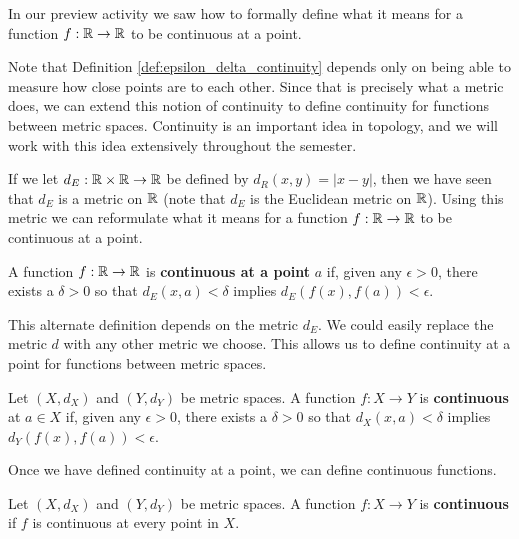\label{sec_cont_func_btwn}
In our preview activity we saw how to formally define what it means for a function $f : \mathbb{R} \to \mathbb{R}$ to be continuous at a point. 


Note that Definition \ref{def:epsilon_delta_continuity} depends only on being able to measure how close points are to each other. Since that is precisely what a metric does, we can extend this notion of continuity to define continuity for functions between metric spaces. Continuity is an important idea in topology, and we will work with this idea extensively throughout the semester.
 
If we let $d_E : \mathbb{R} \times \mathbb{R} \to \mathbb{R}$ be defined by $d_R(x,y) = | x - y |$, then we have seen that $d_E$ is a metric on $\mathbb{R}$ (note that $d_E$ is the Euclidean metric on $\mathbb{R}$). Using this metric we can reformulate what it means for a function $f : \mathbb{R} \to \mathbb{R}$ to be continuous at a point.

\begin{definition} A function $f : \mathbb{R} \to \mathbb{R}$ is \textbf{continuous at a point} $a$ if, given any $\epsilon > 0$, there exists a $\delta > 0$ so that $d_E(x,a) < \delta$ implies $d_E(f(x), f(a)) < \epsilon$.
\end{definition}

This alternate definition depends on the metric $d_E$. We could easily replace the metric $d$ with any other metric we choose. This allows us to define continuity at a point for functions between metric spaces.

\begin{definition} Let $(X,d_X)$ and $(Y, d_Y)$ be metric spaces. A function $f:X \to Y$ is \textbf{continuous} at $a \in X$ if, given any $\epsilon > 0$, there exists a $\delta > 0$ so that $d_X(x,a)< \delta$ implies $d_Y(f(x), f(a)) < \epsilon$.  
\end{definition}

Once we have defined continuity at a point, we can define continuous functions.

\begin{definition} Let $(X,d_X)$ and $(Y, d_Y)$ be metric spaces. A function $f:X \to Y$ is \textbf{continuous} if $f$ is continuous at every point in $X$. 
\end{definition}

